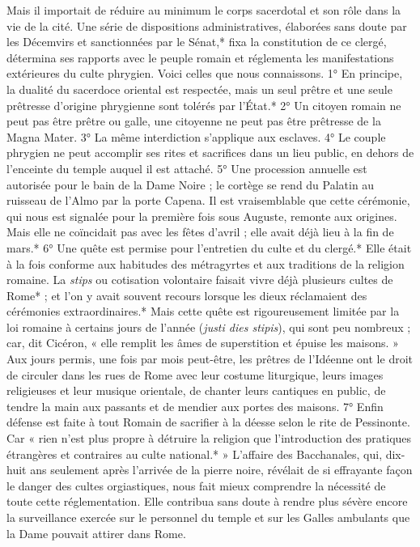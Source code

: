 \documentclass[a4paper, 11pt, oneside, polutonikogreek, french]{article}
\begin{document}
Mais il importait de réduire au minimum le corps sacerdotal et son rôle dans la vie de la cité. Une série de dispositions administratives, élaborées sans doute par les Décemvirs et sanctionnées par le Sénat,* fixa la constitution de ce clergé, détermina ses rapports avec le peuple romain et réglementa les manifestations extérieures du culte phrygien. Voici celles que nous connaissons. 1° En principe, la dualité du sacerdoce oriental est respectée, mais un seul prêtre et une seule prêtresse d'origine phrygienne sont tolérés par l'État.* 2° Un citoyen romain ne peut pas être prêtre ou galle, une citoyenne ne peut pas être prêtresse de la Magna Mater. 3° La même interdiction s'applique aux esclaves. 4° Le couple phrygien ne peut accomplir ses rites et sacrifices dans un lieu public, en dehors de l'enceinte du temple auquel il est attaché. 5° Une procession annuelle est autorisée pour le bain de la Dame Noire ; le cortège se rend du Palatin au ruisseau de l'Almo par la porte Capena. Il est vraisemblable que cette cérémonie, qui nous est signalée pour la première fois sous Auguste, remonte aux origines. Mais elle ne coïncidait pas avec les fêtes d'avril ; elle avait déjà lieu à la fin de mars.* 6° Une quête est permise pour l'entretien du culte et du clergé.* Elle était à la fois conforme aux habitudes des métragyrtes et aux traditions de la religion romaine. La \emph{stips} ou cotisation volontaire faisait vivre déjà plusieurs cultes de Rome* ; et l'on y avait souvent recours lorsque les dieux réclamaient des cérémonies extraordinaires.* Mais cette quête est rigoureusement limitée par la loi romaine à certains jours de l'année (\emph{justi dies stipis}), qui sont peu nombreux ; car, dit Cicéron, « elle remplit les âmes de superstition et épuise les maisons. » Aux jours permis, une fois par mois peut-être, les prêtres de l'Idéenne ont le droit de circuler dans les rues de Rome avec leur costume liturgique, leurs images religieuses et leur musique orientale, de chanter leurs cantiques en public, de tendre la main aux passants et de mendier aux portes des maisons. 7° Enfin défense est faite à tout Romain de sacrifier à la déesse selon le rite de Pessinonte. Car « rien n'est plus propre à détruire la religion que l'introduction des pratiques étrangères et contraires au culte national.* » L'affaire des Bacchanales, qui, dix-huit ans seulement après l'arrivée de la pierre noire, révélait de si effrayante façon le danger des cultes orgiastiques, nous fait mieux comprendre la nécessité de toute cette réglementation. Elle contribua sans doute à rendre plus sévère encore la surveillance exercée sur le personnel du temple et sur les Galles ambulants que la Dame pouvait attirer dans Rome.
\end{document}
